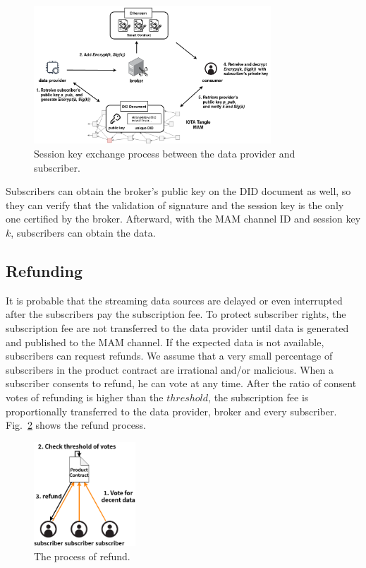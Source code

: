 \documentclass[conference]{IEEEtran}
\begin{document}
\begin{figure}[!t]
    \centering
    \includegraphics[width=3.5in]{key_exchange}
    \caption{Session key exchange process between the data provider and subscriber.}
    \label{fig:key_exchange}
\end{figure}

Subscribers can obtain the broker's public key on the DID document as well, so they can verify that the validation of signature and the session key is the only one certified by the broker. Afterward, with the MAM channel ID and session key $k$, subscribers can obtain the data.

\subsection{Refunding}

It is probable that the streaming data sources are delayed or even interrupted after the subscribers pay the subscription fee. To protect subscriber rights, the subscription fee are not transferred to the data provider until data is generated and published to the MAM channel. If the expected data is not available, subscribers can request refunds. We assume that a very small percentage of subscribers in the product contract are irrational and/or malicious. When a subscriber consents to refund, he can vote at any time. After the ratio of consent votes of refunding is higher than the $threshold$, the subscription fee is proportionally transferred to the data provider, broker and every subscriber. Fig.~\ref{fig:refund} shows the refund process.

\begin{figure}[!t]
	\centering
	\includegraphics[width=1.5in]{refund}
	\caption{The process of refund.}
	\label{fig:refund}
\end{figure}
\end{document}
